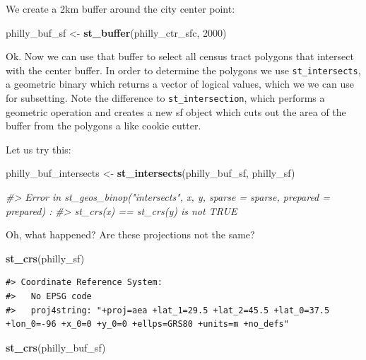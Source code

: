 \documentclass[]{book}
\newenvironment{Shaded}{\begin{snugshade}}{\end{snugshade}}
\newcommand{\KeywordTok}[1]{\textcolor[rgb]{0.13,0.29,0.53}{\textbf{#1}}}
\newcommand{\DecValTok}[1]{\textcolor[rgb]{0.00,0.00,0.81}{#1}}
\newcommand{\StringTok}[1]{\textcolor[rgb]{0.31,0.60,0.02}{#1}}
\newcommand{\CommentTok}[1]{\textcolor[rgb]{0.56,0.35,0.01}{\textit{#1}}}
\newcommand{\NormalTok}[1]{#1}
\begin{document}
We create a 2km buffer around the city center point:

\begin{Shaded}
\begin{Highlighting}[]
\NormalTok{philly_buf_sf <-}\StringTok{ }\KeywordTok{st_buffer}\NormalTok{(philly_ctr_sfc, }\DecValTok{2000}\NormalTok{)}
\end{Highlighting}
\end{Shaded}

Ok. Now we can use that buffer to select all census tract polygons that
intersect with the center buffer. In order to determine the polygons we
use \texttt{st\_intersects}, a geometric binary which returns a vector
of logical values, which we we can use for subsetting. Note the
difference to \texttt{st\_intersection}, which performs a geometric
operation and creates a new sf object which cuts out the area of the
buffer from the polygons a like cookie cutter.

Let us try this:

\begin{Shaded}
\begin{Highlighting}[]
\NormalTok{philly_buf_intersects <-}\StringTok{ }\KeywordTok{st_intersects}\NormalTok{(philly_buf_sf, philly_sf)}

\CommentTok{#> Error in st_geos_binop("intersects", x, y, sparse = sparse, prepared = prepared) : }
\CommentTok{#>   st_crs(x) == st_crs(y) is not TRUE}
\end{Highlighting}
\end{Shaded}

Oh, what happened? Are these projections not the same?

\begin{Shaded}
\begin{Highlighting}[]
\KeywordTok{st_crs}\NormalTok{(philly_sf)}
\end{Highlighting}
\end{Shaded}

\begin{verbatim}
#> Coordinate Reference System:
#>   No EPSG code
#>   proj4string: "+proj=aea +lat_1=29.5 +lat_2=45.5 +lat_0=37.5 +lon_0=-96 +x_0=0 +y_0=0 +ellps=GRS80 +units=m +no_defs"
\end{verbatim}

\begin{Shaded}
\begin{Highlighting}[]
\KeywordTok{st_crs}\NormalTok{(philly_buf_sf)}
\end{Highlighting}
\end{Shaded}
\end{document}
